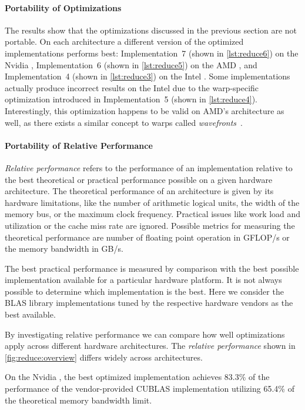 \paragraph{Portability of Optimizations}
The results show that the optimizations discussed in the previous section are not portable.
On each architecture a different version of the optimized implementations performs best:
Implementation~7 (shown in \autoref{lst:reduce6}) on the Nvidia \GPU, Implementation~6 (shown in \autoref{lst:reduce5}) on the AMD \GPU, and Implementation~4 (shown in \autoref{lst:reduce3}) on the Intel \CPU.
Some implementations actually produce incorrect results on the Intel \CPU due to the warp-specific optimization introduced in Implementation~5 (shown in \autoref{lst:reduce4}).
Interestingly, this optimization happens to be valid on AMD's \GPU architecture as well, as there exists a similar concept to warps called \emph{wavefronts}~\cite{AMDGCN2012}.

\paragraph{Portability of Relative Performance}
\emph{Relative performance} refers to the performance of an implementation relative to the best theoretical or practical performance possible on a given hardware architecture.
The theoretical performance of an architecture is given by its hardware limitations, like the number of arithmetic logical units, the width of the memory bus, or the maximum clock frequency.
Practical issues like work load and utilization or the cache miss rate are ignored.
Possible metrics for measuring the theoretical performance are number of floating point operation in GFLOP/s or the memory bandwidth in GB/s.

The best practical performance is measured by comparison with the best possible implementation available for a particular hardware platform.
It is not always possible to determine which implementation is the best.
Here we consider the BLAS library implementations tuned by the respective hardware vendors as the best available.

By investigating relative performance we can compare how well optimizations apply across different hardware architectures.
The \emph{relative performance} shown in \autoref{fig:reduce:overview} differs widely across architectures. %

On the Nvidia \GPU, the best optimized implementation achieves 83.3\% of the performance of the vendor-provided CUBLAS implementation utilizing 65.4\% of the theoretical memory bandwidth limit.


